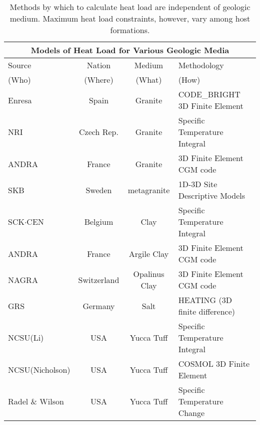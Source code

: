  \begin{table}[h!]
    \centering
    \footnotesize{
    \begin{tabularx}{\textwidth}{|X|c|c|X|}
      \multicolumn{4}{c}{\textbf{Models of Heat Load for Various Geologic Media}}\\
      \hline
      Source & Nation & Medium & Methodology \\  
      (Who) & (Where) & (What) & (How) \\  
      \hline
      Enresa \cite{von_lensa_red-impact_2008}           & Spain       & Granite       &  CODE\_BRIGHT 3D Finite Element \\ 
      NRI   \cite{von_lensa_red-impact_2008}            & Czech Rep.  & Granite       &  Specific Temperature Integral   \\
      ANDRA \cite{andra_granite:_2005}                  & France      & Granite       &  3D Finite Element CGM code   \\
      SKB \cite{ab_long-term_2006}                      & Sweden      & metagranite   &  1D-3D Site  Descriptive Models \\
      SCK$\cdot$CEN   \cite{von_lensa_red-impact_2008}  & Belgium     & Clay          &  Specific Temperature Integral   \\ 
      ANDRA \cite{andra_argile:_2005}                   & France      & Argile Clay   &  3D Finite Element CGM code   \\
      NAGRA \cite{johnson_project_2002, johnson_calculations_2002}  & Switzerland  & Opalinus Clay &  3D Finite Element CGM code \\
      GRS \cite{von_lensa_red-impact_2008}              & Germany     & Salt          &  HEATING (3D finite difference)   \\ 
      NCSU(Li)   \cite{li_examining_2007}               & USA         & Yucca Tuff    &  Specific Temperature Integral \\        
      NCSU(Nicholson) \cite{nicholson_thermal_2007}     & USA         & Yucca Tuff    &  COSMOL 3D Finite Element\\
      Radel \& Wilson \cite{radel_repository_2007}      & USA         & Yucca Tuff    &  Specific Temperature Change \\ 
      \hline
    \end{tabularx}
    \caption[International heat transport modeling methods in various geologic host media.]{Methods by which to calculate heat 
    load are independent of geologic medium. Maximum heat load constraints, however, vary among host formations. }
    \label{tab:heat}
    }
  \end{table}
